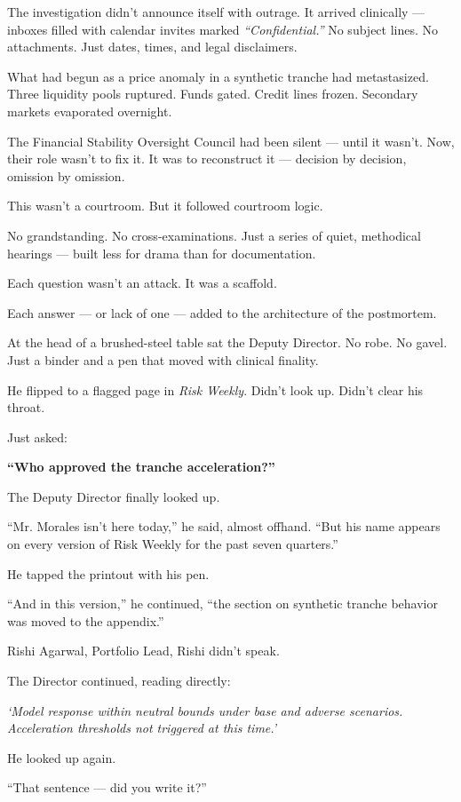 The investigation didn’t announce itself with outrage.
It arrived clinically — inboxes filled with calendar invites marked \textit{“Confidential.”}
No subject lines. No attachments. Just dates, times, and legal disclaimers.

What had begun as a price anomaly in a synthetic tranche had metastasized.
Three liquidity pools ruptured.
Funds gated. Credit lines frozen. Secondary markets evaporated overnight.

The Financial Stability Oversight Council had been silent — until it wasn’t.
Now, their role wasn’t to fix it.
It was to reconstruct it — decision by decision, omission by omission.

This wasn’t a courtroom.
But it followed courtroom logic.

No grandstanding. No cross-examinations.
Just a series of quiet, methodical hearings — built less for drama than for documentation.

Each question wasn’t an attack.
It was a scaffold.

Each answer — or lack of one — added to the architecture of the postmortem.

At the head of a brushed-steel table sat the Deputy Director.
No robe. No gavel. Just a binder and a pen that moved with clinical finality.

He flipped to a flagged page in \textit{Risk Weekly}.
Didn’t look up.
Didn’t clear his throat.

Just asked:

\textbf{“Who approved the tranche acceleration?”}


The Deputy Director finally looked up.

“Mr. Morales isn’t here today,” he said, almost offhand. “But his name appears on every version of Risk Weekly 
for the past seven quarters.”

He tapped the printout with his pen.

“And in this version,” he continued, “the section on synthetic tranche behavior was moved to the appendix.”

Rishi Agarwal, Portfolio Lead, Rishi didn’t speak.

The Director continued, reading directly:

\textit{‘Model response within neutral bounds under base and adverse scenarios. Acceleration thresholds not 
triggered at this time.’}

He looked up again.

“That sentence — did you write it?”

